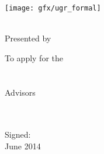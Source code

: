 \begin{titlepage}
    \begin{center}
        \large
        \vspace*{1.5cm}
        \texttt{[image: gfx/ugr\_formal]} \\

        \vspace{1.5cm}

        {\color{ugrOrange}\spacedallcaps{\myTitle}} \\ \bigskip
	{\textcolor{ugrGray} {\small Presented by}} \\ \bigskip
        \spacedlowsmallcaps{\myName}

        \vspace{1.5cm}
\textcolor{ugrGray}
        {\small To apply for the }\normalsize\\
        \large{} \\ 
        \large{} \\
\vspace{1.5cm}
\textcolor{ugrGray}{\small Advisors }\normalsize\\
        \large\spacedlowsmallcaps{\myDirectorOne}\\
        \large\spacedlowsmallcaps{\myDirectorTwo}\\
        \vspace{3cm}

        {\small Signed: \myName }\\ \bigskip
	June 2014


    \end{center}
\end{titlepage}   

